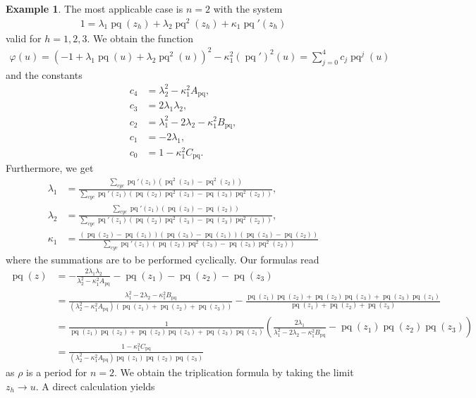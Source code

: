 \documentclass{amsart}
\theoremstyle{definition}
\newtheorem{example}[theorem]{Example}
\DeclareMathOperator{\pq}{pq}
\begin{document}
\begin{example}The most applicable case is $n=2$ with the system
\begin{align*}
    1=\lambda_1\pq(z_h)+\lambda_2\pq^2(z_h)+\kappa_1\pq'(z_h)
\end{align*}
valid for $h=1,2,3$. We obtain the function 
\begin{align*}
        \varphi(u)=\left( -1+\lambda_1\pq(u)+\lambda_2\pq^2(u) \right)^2-\kappa_1^2\left( \pq' \right)^2(u)=\sum_{j=0}^4 c_j \pq^j(u)
\end{align*}
and the constants
\begin{align*}
    c_4&=\lambda_2^2-\kappa_1^2A_{\pq},\\
c_3&=2\lambda_1\lambda_2,\\
c_2&=\lambda_1^2-2\lambda_2-\kappa_1^2B_{\pq},\\
c_1&=-2\lambda_1,\\
c_0&=1-\kappa_1^2C_{\pq}.
\end{align*}
Furthermore, we get
\begin{align*}
    \lambda_1&=\frac{\sum_{cyc}\pq'(z_1)\left(\pq^2(z_3)-\pq^2(z_2) \right)}{\sum_{cyc}\pq'(z_1)\left( \pq(z_2)\pq^2(z_3)-\pq(z_3)\pq^2(z_2) \right) },\\
\lambda_2&=\frac{\sum_{cyc}\pq'(z_1)\left(\pq(z_3)-\pq(z_2) \right)}{\sum_{cyc}\pq'(z_1)\left( \pq(z_2)\pq^2(z_3)-\pq(z_3)\pq^2(z_2) \right) },\\
\kappa_1&=\frac{(\pq(z_2)-\pq(z_1))(\pq(z_3)-\pq(z_1))(\pq(z_3)-\pq(z_2))}{\sum_{cyc}\pq'(z_1)\left( \pq(z_2)\pq^2(z_3)-\pq(z_3)\pq^2(z_2) \right) }
\end{align*}
where the summations are to be performed cyclically. Our formulas read
\begin{align*}
\pq(z)&=-\frac{2\lambda_1\lambda_2}{\lambda_2^2-\kappa_1^2A_{\pq}}-\pq(z_1)-\pq(z_2)-\pq(z_3)\\
&= \frac{\lambda_1^2-2\lambda_2-\kappa_1^2B_{\pq}}{\left(\lambda_2^2-\kappa_1^2A_{\pq}\right)\left(\pq(z_1)+\pq(z_2)+\pq(z_3)\right)}-\frac{\pq(z_1)\pq(z_2)+\pq(z_2)\pq(z_3)+\pq(z_3)\pq(z_1)}{\pq(z_1)+\pq(z_2)+\pq(z_3)}\\
&=\frac{1}{\pq(z_1)\pq(z_2)+\pq(z_2)\pq(z_3)+\pq(z_3)\pq(z_1)}\left( \frac{2\lambda_1}{\lambda_1^2-2\lambda_2-\kappa_1^2B_{\pq}}-\pq(z_1)\pq(z_2)\pq(z_3) \right)\\
&=\frac{1-\kappa_1^2C_{\pq}}{\left(\lambda_2^2-\kappa_1^2A_{\pq}\right)\pq(z_1)\pq(z_2)\pq(z_3)}
\end{align*}
as $\rho$ is a period for $n=2$. We obtain the triplication formula by taking the limit $z_h\to u$. A direct calculation yields

\end{example}
\end{document}
